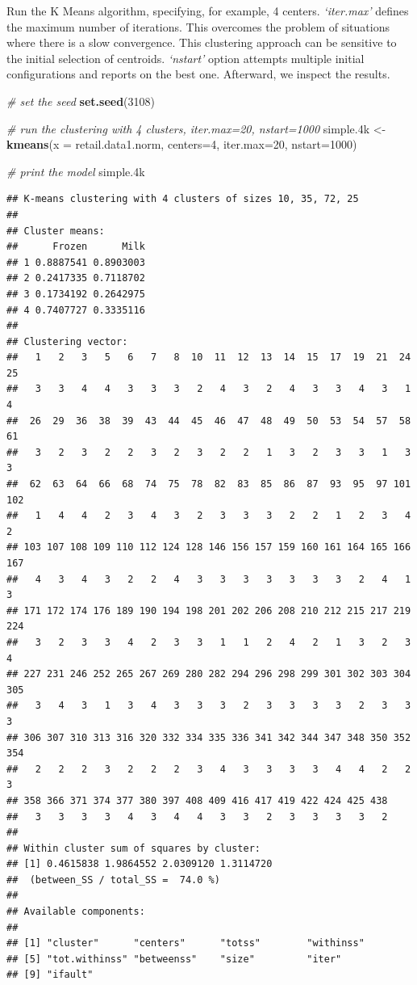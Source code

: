 \documentclass[]{article}
\newenvironment{Shaded}{\begin{snugshade}}{\end{snugshade}}
\newcommand{\KeywordTok}[1]{\textcolor[rgb]{0.13,0.29,0.53}{\textbf{#1}}}
\newcommand{\DataTypeTok}[1]{\textcolor[rgb]{0.13,0.29,0.53}{#1}}
\newcommand{\DecValTok}[1]{\textcolor[rgb]{0.00,0.00,0.81}{#1}}
\newcommand{\StringTok}[1]{\textcolor[rgb]{0.31,0.60,0.02}{#1}}
\newcommand{\CommentTok}[1]{\textcolor[rgb]{0.56,0.35,0.01}{\textit{#1}}}
\newcommand{\NormalTok}[1]{#1}
\begin{document}
Run the K Means algorithm, specifying, for example, 4 centers.
\emph{`iter.max'} defines the maximum number of iterations. This
overcomes the problem of situations where there is a slow convergence.
This clustering approach can be sensitive to the initial selection of
centroids. \emph{`nstart'} option attempts multiple initial
configurations and reports on the best one. Afterward, we inspect the
results.

\begin{Shaded}
\begin{Highlighting}[]
\CommentTok{# set the seed}
\KeywordTok{set.seed}\NormalTok{(}\DecValTok{3108}\NormalTok{)}

\CommentTok{# run the clustering with 4 clusters, iter.max=20, nstart=1000}
\NormalTok{simple.4k <-}\StringTok{ }\KeywordTok{kmeans}\NormalTok{(}\DataTypeTok{x =}\NormalTok{ retail.data1.norm, }\DataTypeTok{centers=}\DecValTok{4}\NormalTok{, }\DataTypeTok{iter.max=}\DecValTok{20}\NormalTok{, }\DataTypeTok{nstart=}\DecValTok{1000}\NormalTok{)}

\CommentTok{# print the model}
\NormalTok{simple.4k}
\end{Highlighting}
\end{Shaded}

\begin{verbatim}
## K-means clustering with 4 clusters of sizes 10, 35, 72, 25
## 
## Cluster means:
##      Frozen      Milk
## 1 0.8887541 0.8903003
## 2 0.2417335 0.7118702
## 3 0.1734192 0.2642975
## 4 0.7407727 0.3335116
## 
## Clustering vector:
##   1   2   3   5   6   7   8  10  11  12  13  14  15  17  19  21  24  25 
##   3   3   4   4   3   3   3   2   4   3   2   4   3   3   4   3   1   4 
##  26  29  36  38  39  43  44  45  46  47  48  49  50  53  54  57  58  61 
##   3   2   3   2   2   3   2   3   2   2   1   3   2   3   3   1   3   3 
##  62  63  64  66  68  74  75  78  82  83  85  86  87  93  95  97 101 102 
##   1   4   4   2   3   4   3   2   3   3   3   2   2   1   2   3   4   2 
## 103 107 108 109 110 112 124 128 146 156 157 159 160 161 164 165 166 167 
##   4   3   4   3   2   2   4   3   3   3   3   3   3   3   2   4   1   3 
## 171 172 174 176 189 190 194 198 201 202 206 208 210 212 215 217 219 224 
##   3   2   3   3   4   2   3   3   1   1   2   4   2   1   3   2   3   4 
## 227 231 246 252 265 267 269 280 282 294 296 298 299 301 302 303 304 305 
##   3   4   3   1   3   4   3   3   3   2   3   3   3   3   2   3   3   3 
## 306 307 310 313 316 320 332 334 335 336 341 342 344 347 348 350 352 354 
##   2   2   2   3   2   2   2   3   4   3   3   3   3   4   4   2   2   3 
## 358 366 371 374 377 380 397 408 409 416 417 419 422 424 425 438 
##   3   3   3   3   4   3   4   4   3   3   2   3   3   3   3   2 
## 
## Within cluster sum of squares by cluster:
## [1] 0.4615838 1.9864552 2.0309120 1.3114720
##  (between_SS / total_SS =  74.0 %)
## 
## Available components:
## 
## [1] "cluster"      "centers"      "totss"        "withinss"    
## [5] "tot.withinss" "betweenss"    "size"         "iter"        
## [9] "ifault"
\end{verbatim}
\end{document}

